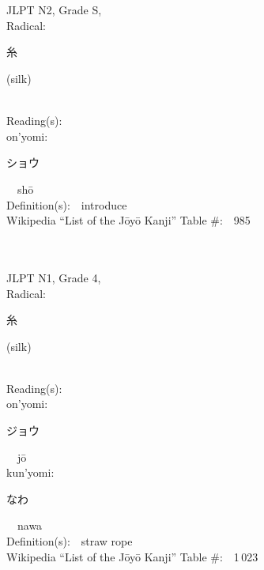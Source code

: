 \begin{multicols}{2}
\ \ \\
{\fontsize{34pt}{40pt}  }\ \ \\  %
{JLPT N2, Grade S, \\Radical:\ \ {\begin{CJK}{UTF8}{min} 糸 \end{CJK}} (silk) } \\
Reading(s):\ \ \\
{\hspace*{1em}}on'yomi:\ \ \\
{\hspace*{2em}}{\begin{CJK}{UTF8}{min} ショウ \end{CJK}}\ \ sh\=o\ \ \\
Definition(s):\ \ introduce \\
Wikipedia ``List of the J\=oy\=o Kanji'' Table \#:\ \ 985 \\
\ \ \\
{\fontsize{34pt}{40pt}  }\ \ \\  %
{JLPT N1, Grade 4, \\Radical:\ \ {\begin{CJK}{UTF8}{min} 糸 \end{CJK}} (silk) } \\
Reading(s):\ \ \\
{\hspace*{1em}}on'yomi:\ \ \\
{\hspace*{2em}}{\begin{CJK}{UTF8}{min} ジョウ \end{CJK}}\ \ j\=o\ \ \\
{\hspace*{1em}}kun'yomi:\ \ \\
{\hspace*{2em}}{\begin{CJK}{UTF8}{min} なわ \end{CJK}}\ \ nawa\ \ \\
Definition(s):\ \ straw rope \\
Wikipedia ``List of the J\=oy\=o Kanji'' Table \#:\ \ 1\,023 \\

\end{multicols}
